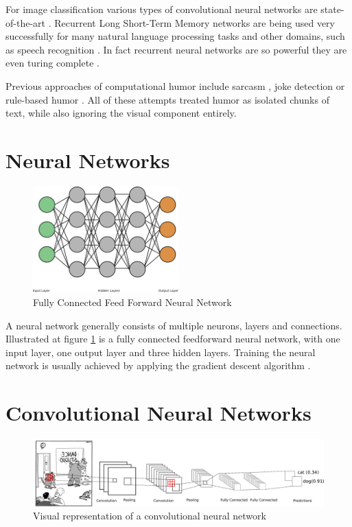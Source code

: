 \documentclass[draft,final,oneside]{vutinfth} %
\begin{document}
For image classification various types of convolutional neural networks are state-of-the-art \cite{dogsvscats}. Recurrent Long Short-Term Memory networks are being used very successfully for many natural language processing tasks and other domains, such as speech recognition \cite{reviewRNN}\cite{googlespeech}. In fact recurrent neural networks are so powerful they are even turing complete \cite{seigelmann:computation}.

Previous approaches of computational humor include sarcasm \cite{Bamman2015ContextualizedSD}, joke detection \cite{Yang2015HumorRA} or rule-based humor \cite{HumoristBot}. All of these attempts treated humor as isolated chunks of text, while also ignoring the visual component entirely.

\section{Neural Networks}
\begin{figure}[ht]
	\centering
  	\includegraphics[width=0.5\textwidth]{graphics/simple_neural_network.png}
	\caption{Fully Connected Feed Forward Neural Network}
	\label{fig:feedforward}
\end{figure}

A neural network generally consists of multiple neurons, layers and connections. Illustrated at figure \ref{fig:feedforward} is a fully connected feedforward neural network, with one input layer, one output layer and three hidden layers. Training the neural network is usually achieved by applying the gradient descent algorithm \cite{bishop}.

\pagebreak
\section{Convolutional Neural Networks}
\begin{figure}[ht]
	\centering
  	\includegraphics[width=1.0\textwidth]{graphics/cnn.png}
	\caption{Visual representation of a convolutional neural network}
	\label{fig:convolutional}
\end{figure}
\end{document}
